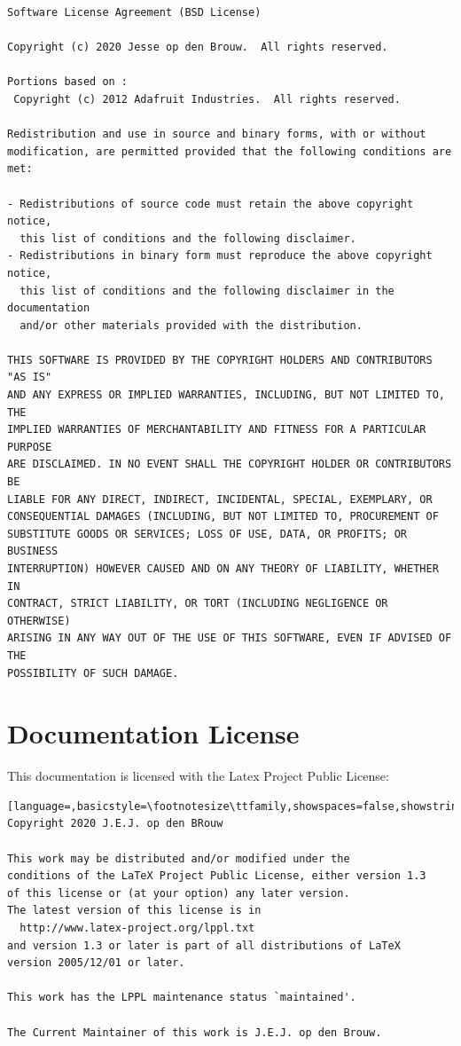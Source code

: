 \documentclass[12pt]{article}
\begin{document}
\begin{lstlisting}[basicstyle=\footnotesize\ttfamily]
Software License Agreement (BSD License)

Copyright (c) 2020 Jesse op den Brouw.  All rights reserved.

Portions based on :
 Copyright (c) 2012 Adafruit Industries.  All rights reserved.

Redistribution and use in source and binary forms, with or without
modification, are permitted provided that the following conditions are met:

- Redistributions of source code must retain the above copyright notice,
  this list of conditions and the following disclaimer.
- Redistributions in binary form must reproduce the above copyright notice,
  this list of conditions and the following disclaimer in the documentation
  and/or other materials provided with the distribution.

THIS SOFTWARE IS PROVIDED BY THE COPYRIGHT HOLDERS AND CONTRIBUTORS "AS IS"
AND ANY EXPRESS OR IMPLIED WARRANTIES, INCLUDING, BUT NOT LIMITED TO, THE
IMPLIED WARRANTIES OF MERCHANTABILITY AND FITNESS FOR A PARTICULAR PURPOSE
ARE DISCLAIMED. IN NO EVENT SHALL THE COPYRIGHT HOLDER OR CONTRIBUTORS BE
LIABLE FOR ANY DIRECT, INDIRECT, INCIDENTAL, SPECIAL, EXEMPLARY, OR
CONSEQUENTIAL DAMAGES (INCLUDING, BUT NOT LIMITED TO, PROCUREMENT OF
SUBSTITUTE GOODS OR SERVICES; LOSS OF USE, DATA, OR PROFITS; OR BUSINESS
INTERRUPTION) HOWEVER CAUSED AND ON ANY THEORY OF LIABILITY, WHETHER IN
CONTRACT, STRICT LIABILITY, OR TORT (INCLUDING NEGLIGENCE OR OTHERWISE)
ARISING IN ANY WAY OUT OF THE USE OF THIS SOFTWARE, EVEN IF ADVISED OF THE
POSSIBILITY OF SUCH DAMAGE.
\end{lstlisting}


\section{Documentation License}
This documentation is licensed with the Latex Project Public License:

\begin{lstlisting}[language=,basicstyle=\footnotesize\ttfamily,showspaces=false,showstringspaces=false]
Copyright 2020 J.E.J. op den BRouw

This work may be distributed and/or modified under the
conditions of the LaTeX Project Public License, either version 1.3
of this license or (at your option) any later version.
The latest version of this license is in
  http://www.latex-project.org/lppl.txt
and version 1.3 or later is part of all distributions of LaTeX
version 2005/12/01 or later.

This work has the LPPL maintenance status `maintained'.
 
The Current Maintainer of this work is J.E.J. op den Brouw.
\end{lstlisting}
\end{document}
